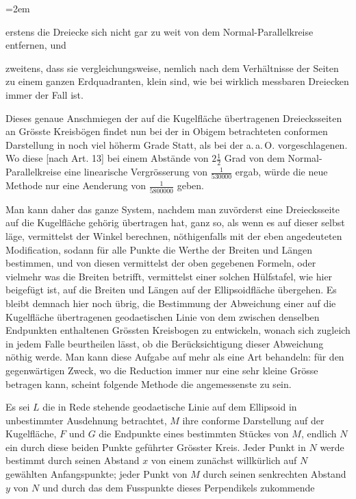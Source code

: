 \begin{list}{}{\leftmargin=2em\rightmargin=0pt\itemindent=0pt\itemsep=0pt\parsep=0pt}
\item erstens die Dreiecke sich nicht gar zu weit von dem Normal-Parallelkreise entfernen, und
\item zweitens, dass sie vergleichungsweise, nemlich nach dem Verhältnisse der Seiten zu einem ganzen Erdquadranten, klein sind, wie bei wirklich messbaren Dreiecken immer der Fall ist.
\end{list}
\noindent\hspace*{\parindent}Dieses genaue Anschmiegen der auf die Kugelfläche übertragenen Dreiecksseiten an Grösste Kreisbögen findet nun bei der in Obigem betrachteten conformen Darstellung in noch viel höherm Grade Statt, als bei der a.\,a.\,O. vorgeschlagenen. Wo diese [nach Art. 13] bei einem Abstände von \(2\tfrac{1}{2}\) Grad von dem Normal-Parallelkreise eine linearische Vergrösserung von \(\tfrac{1}{530000}\) ergab, würde die neue Methode nur eine Aenderung von \(\tfrac{1}{5800000}\) geben.

Man kann daher das ganze System, nachdem man zuvörderst eine Dreiecksseite auf die Kugelfläche gehörig übertragen hat, ganz so, als wenn es auf dieser selbst läge, vermittelst der Winkel berechnen, nöthigenfalls mit der eben angedeuteten Modification, sodann für alle Punkte die Werthe der Breiten und Längen bestimmen, und von diesen vermittelst der oben gegebenen Formeln, oder vielmehr was die Breiten betrifft, vermittelst einer solchen Hülfstafel, wie hier beigefügt ist, auf die Breiten und Längen auf der Ellipsoidfläche übergehen.
\indent Es bleibt demnach hier noch übrig, die Bestimmung der Abweichung einer auf die Kugelfläche übertragenen geodaetischen Linie von dem zwischen denselben Endpunkten enthaltenen Grössten Kreisbogen zu entwickeln, wonach sich zugleich in jedem Falle beurtheilen lässt, ob die Berücksichtigung dieser Abweichung nöthig werde. Man kann diese Aufgabe auf mehr als eine Art behandeln: für den gegenwärtigen Zweck, wo die Reduction immer nur eine sehr kleine Grösse betragen kann, scheint folgende Methode die angemessenste zu sein.

Es sei \(L\) die in Rede stehende geodaetische Linie auf dem Ellipsoid in unbestimmter Ausdehnung betrachtet, \(M\) ihre conforme Darstellung auf der Kugelfläche, \(F\) und \(G\) die Endpunkte eines bestimmten Stückes von \(M\), endlich \(N\) ein durch diese beiden Punkte geführter Grösster Kreis. Jeder Punkt in \(N\) werde bestimmt durch seinen Abstand \(x\) von einem zunächst willkürlich auf \(N\) gewählten Anfangspunkte; jeder Punkt von \(M\) durch seinen senkrechten Abstand \(y\) von \(N\) und durch das dem Fusspunkte dieses Perpendikels zukommende
